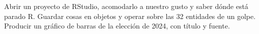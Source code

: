 \yasabemos
  {Abrir un proyecto de RStudio, acomodarlo a nuestro gusto y saber dónde está parado R.}
  {Guardar cosas en objetos y operar sobre las 32 entidades de un golpe.}
  {Producir un gráfico de barras de la elección de 2024, con título y fuente.}



